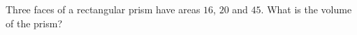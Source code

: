 Three faces of a rectangular prism have areas $16$, $20$ and $45$. What is the volume of the prism?
